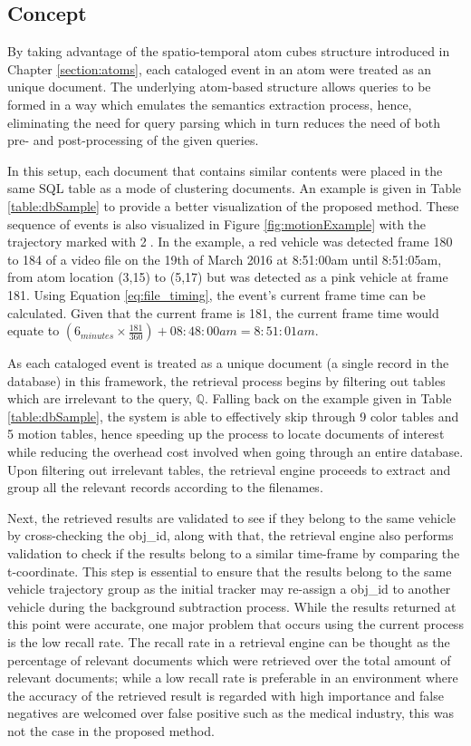 \subsection{Concept}
\label{versionOneConcept}
By taking advantage of the spatio-temporal atom cubes structure introduced in Chapter \ref{section:atoms}, each cataloged event in an atom were treated as an unique document. The underlying atom-based structure allows queries to be formed in a way which emulates the semantics extraction process, hence, eliminating the need for query parsing which in turn reduces the need of both pre- and post-processing of the given queries. 

In this setup, each document that contains similar contents were placed in the same SQL table as a mode of clustering documents. An example is given in Table \ref{table:dbSample} to provide a better visualization of the proposed method. These sequence of events is also visualized in Figure \ref{fig:motionExample} with the trajectory marked with \textcircled{2}. In the example, a red vehicle was detected frame 180 to 184 of a video file on the 19th of March 2016 at 8:51:00am until 8:51:05am, from atom location (3,15) to (5,17) but was detected as a pink vehicle at frame 181. Using Equation \ref{eq:file_timing}, the event's current frame time can be calculated. Given that the current frame is 181, the current frame time would equate to  $(6_{minutes} \times \frac{181}{360}) + 08:48:00am = 8:51:01am$.

As each cataloged event is treated as a unique document (a single record in the database) in this framework, the retrieval process begins by filtering out tables which are irrelevant to the query, $\mathbb{Q}$. Falling back on the example given in Table \ref{table:dbSample}, the system is able to effectively skip through 9 color tables and 5 motion tables, hence speeding up the process to locate documents of interest while reducing the overhead cost involved when going through an entire database. Upon filtering out irrelevant tables, the retrieval engine proceeds to extract and group all the relevant records according to the filenames.

Next, the retrieved results are validated to see if they belong to the same vehicle by cross-checking the obj\_id, along with that, the retrieval engine also performs validation to check if the results belong to a similar time-frame by comparing the t-coordinate. This step is essential to ensure that the results belong to the same vehicle trajectory group as the initial tracker may re-assign a obj\_id to another vehicle during the background subtraction process. While the results returned at this point were accurate, one major problem that occurs using the current process is the low recall rate. The recall rate in a retrieval engine can be thought as the percentage of relevant documents which were retrieved over the total amount of relevant documents; while a low recall rate is preferable in an environment where the accuracy of the retrieved result is regarded with high importance and false negatives are welcomed over false positive such as the medical industry, this was not the case in the proposed method.

